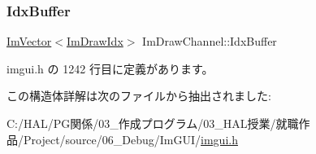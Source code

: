 \mbox{\label{struct_im_draw_channel_a7fbed7d3523124fadd94859d5ac0fd67}} 
\subsubsection{\texorpdfstring{Idx\+Buffer}{IdxBuffer}}
{\footnotesize\ttfamily \mbox{\hyperlink{class_im_vector}{Im\+Vector}}$<$\mbox{\hyperlink{imgui_8h_afdc8744a5ac1a968b1ddfa47e13b2fa1}{Im\+Draw\+Idx}}$>$ Im\+Draw\+Channel\+::\+Idx\+Buffer}



 imgui.\+h の 1242 行目に定義があります。



この構造体詳解は次のファイルから抽出されました\+:\begin{DoxyCompactItemize}
\item 
C\+:/\+H\+A\+L/\+P\+G関係/03\+\_\+作成プログラム/03\+\_\+\+H\+A\+L授業/就職作品/\+Project/source/06\+\_\+\+Debug/\+Im\+G\+U\+I/\mbox{\hyperlink{imgui_8h}{imgui.\+h}}\end{DoxyCompactItemize}

